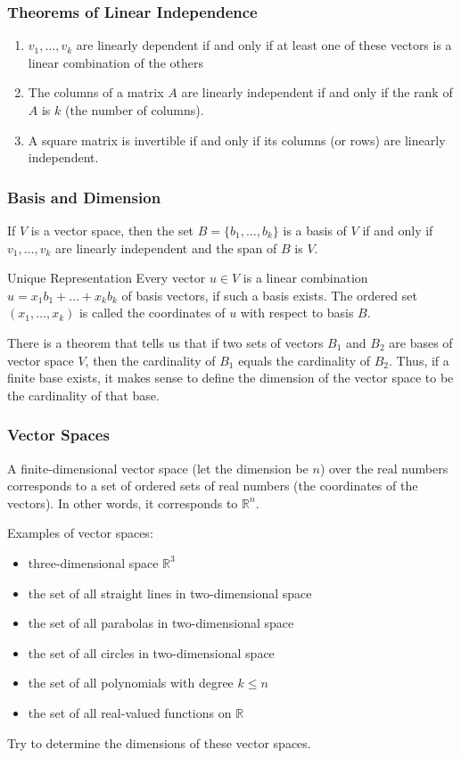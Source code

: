 \documentclass[xcolor=dvipsnames]{beamer}
\begin{document}
\begin{frame}
  \frametitle{Theorems of Linear Independence}
  \begin{enumerate}
  \item $v_{1},{\ldots},v_{k}$ are linearly dependent if and only if
    at least one of these vectors is a linear combination of the
    others
  \item The columns of a matrix $A$ are linearly independent if and
    only if the rank of $A$ is $k$ (the number of columns).
  \item A square matrix is invertible if and only if its columns (or
    rows) are linearly independent.
  \end{enumerate}
\end{frame}

\begin{frame}
  \frametitle{Basis and Dimension}
  If $V$ is a vector space, then the set $B=\{b_{1},{\ldots},b_{k}\}$
  is a \alert{basis} of $V$ if and only if $v_{1},{\ldots},v_{k}$ are linearly
  independent and the span of $B$ is $V$.
  \begin{block}{Unique Representation}
    Every vector $u\in{}V$ is a linear combination
    $u=x_{1}b_{1}+{\ldots}+x_{k}b_{k}$ of basis vectors, if such a basis
    exists. The ordered set $(x_{1},{\ldots},x_{k})$ is called the
    \alert{coordinates} of $u$ with respect to basis $B$. 
  \end{block}
  There is a theorem that tells us that if two sets of vectors $B_{1}$
  and $B_{2}$ are bases of vector space $V$, then the cardinality of
  $B_{1}$ equals the cardinality of $B_{2}$. Thus, if a finite base
  exists, it makes sense to define the \alert{dimension} of the vector
  space to be the cardinality of that base.
\end{frame}

\begin{frame}
  \frametitle{Vector Spaces}
  A finite-dimensional vector space (let the dimension be $n$) over
  the real numbers corresponds to a set of ordered sets of real
  numbers (the coordinates of the vectors). In other words, it
  corresponds to $\mathbb{R}^{n}$. 

\medskip

Examples of vector spaces:
\begin{itemize}
\item three-dimensional space $\mathbb{R}^{3}$
\item the set of all straight lines in two-dimensional space
\item the set of all parabolas in two-dimensional space
\item the set of all circles in two-dimensional space
\item the set of all polynomials with degree $k\leq{}n$
\item the set of all real-valued functions on $\mathbb{R}$
\end{itemize}
Try to determine the dimensions of these vector spaces.
\end{frame}
\end{document}

